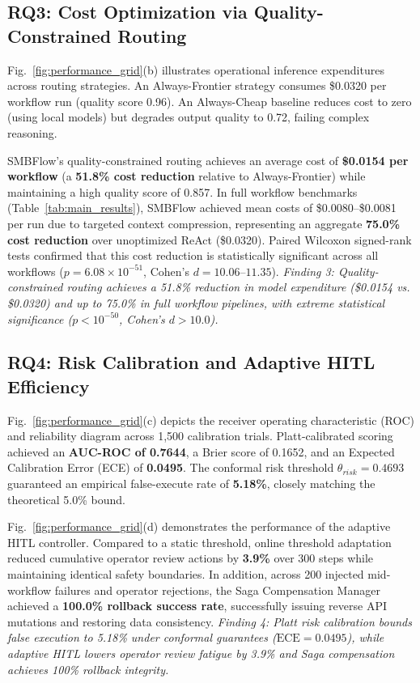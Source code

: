 \documentclass[conference]{IEEEtran}
\begin{document}
\subsection{RQ3: Cost Optimization via Quality-Constrained Routing}
Fig.~\ref{fig:performance_grid}(b) illustrates operational inference expenditures across routing strategies. An Always-Frontier strategy consumes \$0.0320 per workflow run (quality score 0.96). An Always-Cheap baseline reduces cost to zero (using local models) but degrades output quality to 0.72, failing complex reasoning. 

SMBFlow's quality-constrained routing achieves an average cost of \textbf{\$0.0154 per workflow} (a \textbf{51.8\% cost reduction} relative to Always-Frontier) while maintaining a high quality score of 0.857. In full workflow benchmarks (Table~\ref{tab:main_results}), SMBFlow achieved mean costs of \$0.0080--\$0.0081 per run due to targeted context compression, representing an aggregate \textbf{75.0\% cost reduction} over unoptimized ReAct (\$0.0320). Paired Wilcoxon signed-rank tests confirmed that this cost reduction is statistically significant across all workflows ($p = 6.08 \times 10^{-51}$, Cohen's $d = 10.06$--$11.35$). \emph{Finding 3: Quality-constrained routing achieves a 51.8\% reduction in model expenditure (\$0.0154 vs. \$0.0320) and up to 75.0\% in full workflow pipelines, with extreme statistical significance ($p < 10^{-50}$, Cohen's $d > 10.0$).}

\subsection{RQ4: Risk Calibration and Adaptive HITL Efficiency}
Fig.~\ref{fig:performance_grid}(c) depicts the receiver operating characteristic (ROC) and reliability diagram across 1,500 calibration trials. Platt-calibrated scoring achieved an \textbf{AUC-ROC of 0.7644}, a Brier score of 0.1652, and an Expected Calibration Error (ECE) of \textbf{0.0495}. The conformal risk threshold $\theta_{risk} = 0.4693$ guaranteed an empirical false-execute rate of \textbf{5.18\%}, closely matching the theoretical 5.0\% bound.

Fig.~\ref{fig:performance_grid}(d) demonstrates the performance of the adaptive HITL controller. Compared to a static threshold, online threshold adaptation reduced cumulative operator review actions by \textbf{3.9\%} over 300 steps while maintaining identical safety boundaries. In addition, across 200 injected mid-workflow failures and operator rejections, the Saga Compensation Manager achieved a \textbf{100.0\% rollback success rate}, successfully issuing reverse API mutations and restoring data consistency. \emph{Finding 4: Platt risk calibration bounds false execution to 5.18\% under conformal guarantees ($\text{ECE} = 0.0495$), while adaptive HITL lowers operator review fatigue by 3.9\% and Saga compensation achieves 100\% rollback integrity.}
\end{document}
